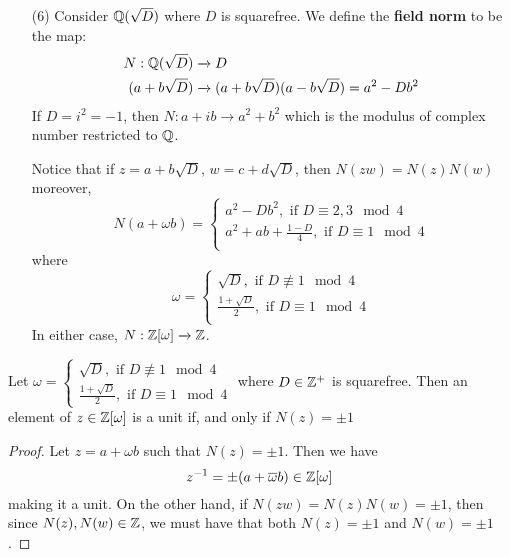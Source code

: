\begin{example}
\begin{enumerate}
    \item[(6)] Consider $\mathbb{Q}(\sqrt{D})$ where $D$ is squarefree. We define
      the  \textbf{field norm} to be the map:
      \begin{align*}
        N: \mathbb{Q}(\sqrt{D}) & \xrightarrow{} D  \\
        (a+b\sqrt{D}) & \xrightarrow{} (a+b\sqrt{D})(a-b\sqrt{D})=a^2-Db^2 \\
      \end{align*}
      If $D=i^2=-1$, then  $N:a+ib \xrightarrow{} a^2+b^2$ which is the
      modulus of complex number restricted to $\mathbb{Q}$.

      Notice that if  $z=a+b\sqrt{D}$, $w=c+d\sqrt{D}$, then
      $N(zw)=N(z)N(w)$ moreover,
      \begin{equation*}
        N(a+\omega b)=\begin{cases}
          a^2-Db^2, \text{ if } D \equiv 2, 3 \mod{4} \\
          a^2+ab+\frac{1-D}{4}, \text{ if } D \equiv 1 \mod{4} \\
        \end{cases}
      \end{equation*}
      where
      \begin{equation*}
        \omega=\begin{cases}
          \sqrt{D}, \text{ if } D \not\equiv 1 \mod{4}   \\
          \frac{1+\sqrt{D}}{2}, \text{ if } D \equiv 1 \mod{4}    \\
        \end{cases}
      \end{equation*}
      In either case, $N:\mathbb{Z}[\omega] \xrightarrow{} \mathbb{Z}$.
  \end{enumerate}
\end{example}

\begin{lemma}\label{lemma_5.1.4}
  Let $\omega=\begin{cases} \sqrt{D}, \text{ if } D \not\equiv 1 \mod{4}   \\
    \frac{1+\sqrt{D}}{2}, \text{ if } D \equiv 1 \mod{4}
  \end{cases}$
  where $D \in \mathbb{Z}^+$ is squarefree. Then an element of $z \in \mathbb{Z}[\omega]$ is a
  unit if, and only if $N(z)=\pm1$
\end{lemma}
\begin{proof}
  Let $z=a+\omega b$ such that $N(z)=\pm 1$. Then we have
  \begin{equation*}
    z^{-1}=\pm (a+\overline{\omega}b) \in \mathbb{Z}[\omega]
  \end{equation*}
  making it a unit. On the other hand, if $N(zw)=N(z)N(w)=\pm 1$, then since
  $N(z),N(w) \in \mathbb{Z}$, we must have that both $N(z)=\pm 1$ and $N(w)=\pm 1$.
\end{proof}
